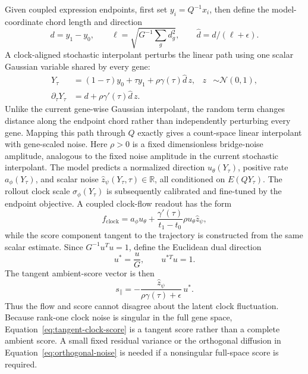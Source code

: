 \documentclass[11pt]{article}
\newcommand{\R}{\mathbb{R}}
\newcommand{\N}{\mathcal{N}}
\begin{document}
Given coupled expression endpoints, first set $y_i=Q^{-1}x_i$, then define the
model-coordinate chord length and direction
\begin{equation}
  d=y_1-y_0,\qquad
  \ell=\sqrt{G^{-1}\sum_gd_g^2},\qquad
  \widehat d=d/(\ell+\epsilon).
  \label{eq:clock-chord}
\end{equation}
A clock-aligned stochastic interpolant perturbs the linear path using one
scalar Gaussian variable shared by every gene:
\begin{align}
  Y_\tau
  &=(1-\tau)y_0+\tau y_1+\rho\gamma(\tau)\widehat d\,z,
  &z&\sim\N(0,1),
  \label{eq:clock-interpolant}\\
  \partial_\tau Y_\tau
  &=d+\rho\gamma'(\tau)\widehat d\,z.
  \label{eq:clock-flow-target}
\end{align}
Unlike the current gene-wise Gaussian interpolant, the random term changes
distance along the endpoint chord rather than independently perturbing every
gene. Mapping this path through $Q$ exactly gives a count-space linear
interpolant with gene-scaled noise. Here $\rho>0$ is a fixed dimensionless
bridge-noise amplitude, analogous
to the fixed noise amplitude in the current stochastic interpolant. The model
predicts a normalized direction $u_\theta(Y_\tau)$, positive rate
$a_\phi(Y_\tau)$, and scalar noise
$\widehat z_\psi(Y_\tau,\tau)\in\R$, all conditioned on $E(QY_\tau)$. The
rollout clock scale $\sigma_\phi(Y_\tau)$ is subsequently calibrated and fine-tuned by the
endpoint objective. A coupled clock-flow readout has the form
\begin{equation}
  f_{\mathrm{clock}}
  =a_\phi u_\theta
   +\frac{\gamma'(\tau)}{t_1-t_0}
    \rho u_\theta\widehat z_\psi,
  \label{eq:coupled-clock-flow}
\end{equation}
while the score component tangent to the trajectory is constructed from the
same scalar estimate. Since $G^{-1}u^Tu=1$, define the Euclidean dual direction
\begin{equation}
  u^*=\frac{u}{G},
  \qquad
  u^{*T}u=1.
  \label{eq:dual-direction}
\end{equation}
The tangent ambient-score vector is then
\begin{equation}
  s_\parallel
  =-\frac{\widehat z_\psi}
          {\rho\gamma(\tau)+\epsilon}\,u^*.
  \label{eq:tangent-clock-score}
\end{equation}
Thus the flow and score cannot disagree about the latent clock fluctuation.
Because rank-one clock noise is singular in the full gene space,
Equation~\ref{eq:tangent-clock-score} is a tangent score rather than a complete
ambient score. A small fixed residual variance or the orthogonal diffusion in
Equation~\ref{eq:orthogonal-noise} is needed if a nonsingular full-space score
is required.
\end{document}
